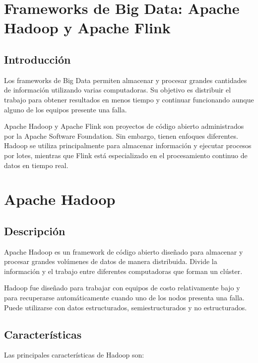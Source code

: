 
\section{Frameworks de Big Data: Apache Hadoop y Apache Flink}

\subsection{Introducción}

Los frameworks de Big Data permiten almacenar y procesar grandes cantidades
de información utilizando varias computadoras. Su objetivo es distribuir el
trabajo para obtener resultados en menos tiempo y continuar funcionando
aunque alguno de los equipos presente una falla.

Apache Hadoop y Apache Flink son proyectos de código abierto administrados por
la Apache Software Foundation. Sin embargo, tienen enfoques diferentes.
Hadoop se utiliza principalmente para almacenar información y ejecutar
procesos por lotes, mientras que Flink está especializado en el procesamiento
continuo de datos en tiempo real.

\section{Apache Hadoop}

\subsection{Descripción}

Apache Hadoop es un framework de código abierto diseñado para almacenar y
procesar grandes volúmenes de datos de manera distribuida. Divide la
información y el trabajo entre diferentes computadoras que forman un clúster.

Hadoop fue diseñado para trabajar con equipos de costo relativamente bajo y
para recuperarse automáticamente cuando uno de los nodos presenta una falla.
Puede utilizarse con datos estructurados, semiestructurados y no estructurados.

\subsection{Características}

Las principales características de Hadoop son:

